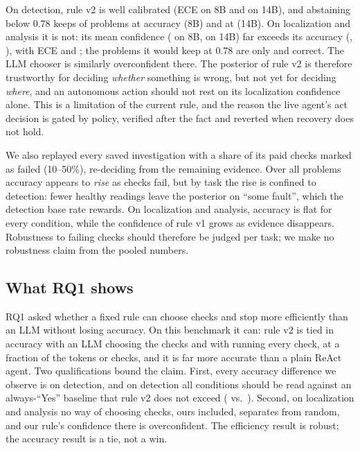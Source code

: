 On detection, rule v2 is well calibrated (ECE \eceDetOursEight{} on 8B and \eceDetOursFourteen{}
on 14B), and abstaining below 0.78 keeps \keepDetOursEight{} of problems at
\keepAccDetOursEight{} accuracy (8B) and \keepDetOursFourteen{} at \keepAccDetOursFourteen{}
(14B). On localization and analysis it is not: its mean confidence (\confLAOursEight{} on 8B,
\confLAOursFourteen{} on 14B) far exceeds its accuracy (\accLAOursEight{}, \accLAOursFourteen{}),
with ECE \eceLAOursEight{} and \eceLAOursFourteen{}; the problems it would keep at 0.78 are only
\keepAccLAOursEight{} and \keepAccLAOursFourteen{} correct. The LLM chooser is similarly
overconfident there. The posterior of rule v2 is therefore trustworthy for deciding \emph{whether} something is
wrong, but not yet for deciding \emph{where}, and an autonomous action should not rest on its
localization confidence alone. This is a limitation of the current rule, and the reason the live
agent's act decision is gated by policy, verified after the fact and reverted when recovery does
not hold.

We also replayed every saved investigation with a share of its paid checks marked as failed
(10--50\%), re-deciding from the remaining evidence. Over all problems accuracy appears to
\emph{rise} as checks fail, but by task the rise is confined to detection: fewer healthy readings
leave the posterior on ``some fault'', which the detection base rate rewards. On localization and
analysis, accuracy is flat for every condition, while the confidence of rule v1 grows as evidence
disappears. Robustness to failing checks should therefore be judged per task; we make no
robustness claim from the pooled numbers.

\subsection{What RQ1 shows}
\label{sec:rq1-summary}

RQ1 asked whether a fixed rule can choose checks and stop more efficiently than an LLM without
losing accuracy. On this benchmark it can: rule v2 is tied in accuracy with an LLM choosing the
checks and with running every check, at a fraction of the tokens or checks, and it is far more
accurate than a plain ReAct agent. Two qualifications bound the claim. First, every accuracy
difference we observe is on detection, and on detection all conditions should be read against
an always-``Yes'' baseline that rule v2 does not exceed (\accDetOursEight{} vs.\
\accAlwaysYesDet{}). Second, on localization and analysis no way of choosing checks, ours
included, separates from random, and our rule's confidence there is overconfident. The efficiency
result is robust; the accuracy result is a tie, not a win.
